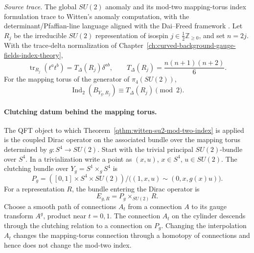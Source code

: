 \begin{quotedtheorem}
\label{qthm:witten-su2-mod-two-index}
\emph{Source trace.}  The global \(SU(2)\) anomaly and its mod-two
mapping-torus index formulation trace to Witten's anomaly computation, with
the determinant/Pfaffian-line language aligned with the Dai--Freed framework
\cite{Witten1982,DaiFreed1994}.
Let \(R_j\) be the irreducible \(SU(2)\) representation of isospin
\(j\in\frac12\mathbb Z_{\geq0}\), and set \(n=2j\).  With the trace-delta
normalization of Chapter~\ref{ch:curved-background-gauge-fields-index-theory},
\begin{equation}
  \operatorname{tr}_{R_j}(t^a t^b)
  =
  T_\Delta(R_j)\delta^{ab},
  \qquad
  T_\Delta(R_j)
  =
  \frac{n(n+1)(n+2)}6 .
  \label{eq:su2-trace-delta-dynkin-index}
\end{equation}
For the mapping torus of the generator of \(\pi_4(SU(2))\),
\begin{equation}
  \operatorname{Ind}_2(B_{Y_g,R_j})
  \equiv
  T_\Delta(R_j)
  \pmod2 .
  \label{eq:witten-su2-index-parity-dynkin}
\end{equation}
\end{quotedtheorem}

\paragraph{Clutching datum behind the mapping torus.}
The QFT object to which Theorem~\ref{qthm:witten-su2-mod-two-index} is
applied is the coupled Dirac operator on the associated bundle over the
mapping torus determined by \(g:S^4\to SU(2)\).  Start with the
trivial principal \(SU(2)\)-bundle over \(S^4\).  In a trivialization write a
point as \((x,u)\), \(x\in S^4\), \(u\in SU(2)\).  The clutching bundle over
\(Y_g=S^1\times_g S^4\) is
\begin{equation}
  P_g
  =
  ([0,1]\times S^4\times SU(2))/
  \bigl((1,x,u)\sim(0,x,g(x)u)\bigr).
  \label{eq:witten-su2-clutching-bundle}
\end{equation}
For a representation \(R\), the bundle entering the Dirac operator is
\[
  E_{g,R}=P_g\times_{SU(2)}R .
\]
Choose a smooth path of connections \(A_t\) from a connection \(A\) to its
gauge transform \(A^g\), product near \(t=0,1\).  The connection \(A_t\) on
the cylinder descends through the clutching relation to a connection on
\(P_g\).  Changing the interpolation \(A_t\) changes the mapping-torus
connection through a homotopy of connections and hence does not change the
mod-two index.

